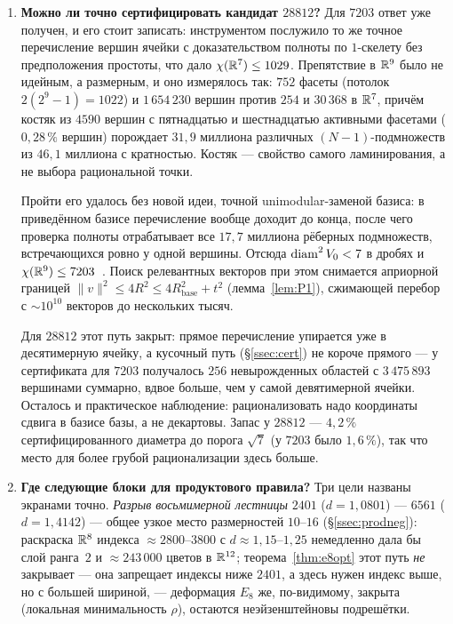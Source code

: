 \begin{enumerate}[leftmargin=1.5em,itemsep=4pt]
\item \textbf{Можно ли точно сертифицировать кандидат $28812$?}
Для $7203$ ответ уже получен, и его стоит записать: инструментом послужило то
же точное перечисление вершин ячейки с доказательством полноты по $1$-скелету
без предположения простоты, что дало $\chi(\mathbb{R}^7)\le1029$. Препятствие в $\mathbb{R}^9$
было не идейным, а размерным, и оно измерялось так: $752$ фасеты (потолок
$2(2^9-1)=1022$) и $1\,654\,230$ вершин против $254$ и $30\,368$ в $\mathbb{R}^7$,
причём костяк из $4590$ вершин с пятнадцатью и шестнадцатью активными фасетами
($0{,}28\,\%$ вершин) порождает $31{,}9$ миллиона различных
$(N-1)$-подмножеств из $46{,}1$ миллиона с кратностью. Костяк --- свойство
самого ламинирования, а не выбора рациональной точки.

Пройти его удалось без новой идеи, точной unimodular-заменой базиса: в
приведённом базисе перечисление вообще доходит до конца, после чего проверка
полноты отрабатывает все $17{,}7$ миллиона рёберных подмножеств, встречающихся
ровно у одной вершины. Отсюда $\operatorname{diam}^2V_0<7$ в дробях и
$\chi(\mathbb{R}^9)\le7203$~\cite{Bounds}. Поиск релевантных векторов при этом
снимается априорной границей $\|v\|^2\le4R^2\le4R_{\text{base}}^2+t^2$
(лемма~\ref{lem:P1}), сжимающей перебор с ${\sim}10^{10}$ векторов до
нескольких тысяч.

Для $28812$ этот путь закрыт: прямое перечисление упирается уже в
десятимерную ячейку, а кусочный путь (\S\ref{ssec:cert}) не короче прямого ---
у сертификата для $7203$ получалось $256$ невырожденных областей с
$3\,475\,893$ вершинами суммарно, вдвое больше, чем у самой девятимерной
ячейки. Осталось и практическое наблюдение: рационализовать надо координаты
сдвига в базисе базы, а не декартовы. Запас у $28812$ --- $4{,}2\,\%$
сертифицированного диаметра до порога $\sqrt7$ (у $7203$ было $1{,}6\,\%$),
так что место для более грубой рационализации здесь больше.

\item \textbf{Где следующие блоки для продуктового правила?} Три цели названы
экранами точно. \emph{Разрыв восьмимерной лестницы} $2401$ ($d=1{,}0801$) ---
$6561$ ($d=1{,}4142$) --- общее узкое место размерностей $10$--$16$
(\S\ref{ssec:prodneg}): раскраска $\mathbb{R}^8$ индекса ${\approx}2800$--$3800$ с
$d\approx1{,}15$--$1{,}25$ немедленно дала бы слой ранга~$2$ и
${\approx}243\,000$ цветов в $\mathbb{R}^{12}$; теорема~\ref{thm:e8opt} этот путь
\emph{не} закрывает --- она запрещает индексы ниже $2401$, а здесь нужен
индекс выше, но с большей шириной, --- деформация $E_8$ же, по-видимому,
закрыта (локальная минимальность $\rho$), остаются неэйзенштейновы
подрешётки.


\end{enumerate}
